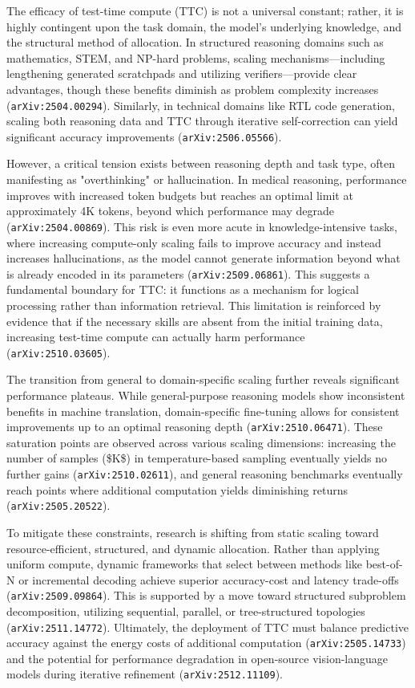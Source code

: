 \documentclass[11pt]{article}
\begin{document}
The efficacy of test-time compute (TTC) is not a universal constant; rather, it is highly contingent upon the task domain, the model's underlying knowledge, and the structural method of allocation. In structured reasoning domains such as mathematics, STEM, and NP-hard problems, scaling mechanisms—including lengthening generated scratchpads and utilizing verifiers—provide clear advantages, though these benefits diminish as problem complexity increases (\texttt{arXiv:2504.00294}). Similarly, in technical domains like RTL code generation, scaling both reasoning data and TTC through iterative self-correction can yield significant accuracy improvements (\texttt{arXiv:2506.05566}).

However, a critical tension exists between reasoning depth and task type, often manifesting as "overthinking" or hallucination. In medical reasoning, performance improves with increased token budgets but reaches an optimal limit at approximately 4K tokens, beyond which performance may degrade (\texttt{arXiv:2504.00869}). This risk is even more acute in knowledge-intensive tasks, where increasing compute-only scaling fails to improve accuracy and instead increases hallucinations, as the model cannot generate information beyond what is already encoded in its parameters (\texttt{arXiv:2509.06861}). This suggests a fundamental boundary for TTC: it functions as a mechanism for logical processing rather than information retrieval. This limitation is reinforced by evidence that if the necessary skills are absent from the initial training data, increasing test-time compute can actually harm performance (\texttt{arXiv:2510.03605}).

The transition from general to domain-specific scaling further reveals significant performance plateaus. While general-purpose reasoning models show inconsistent benefits in machine translation, domain-specific fine-tuning allows for consistent improvements up to an optimal reasoning depth (\texttt{arXiv:2510.06471}). These saturation points are observed across various scaling dimensions: increasing the number of samples (\$K\$) in temperature-based sampling eventually yields no further gains (\texttt{arXiv:2510.02611}), and general reasoning benchmarks eventually reach points where additional computation yields diminishing returns (\texttt{arXiv:2505.20522}).

To mitigate these constraints, research is shifting from static scaling toward resource-efficient, structured, and dynamic allocation. Rather than applying uniform compute, dynamic frameworks that select between methods like best-of-N or incremental decoding achieve superior accuracy-cost and latency trade-offs (\texttt{arXiv:2509.09864}). This is supported by a move toward structured subproblem decomposition, utilizing sequential, parallel, or tree-structured topologies (\texttt{arXiv:2511.14772}). Ultimately, the deployment of TTC must balance predictive accuracy against the energy costs of additional computation (\texttt{arXiv:2505.14733}) and the potential for performance degradation in open-source vision-language models during iterative refinement (\texttt{arXiv:2512.11109}).
\end{document}
